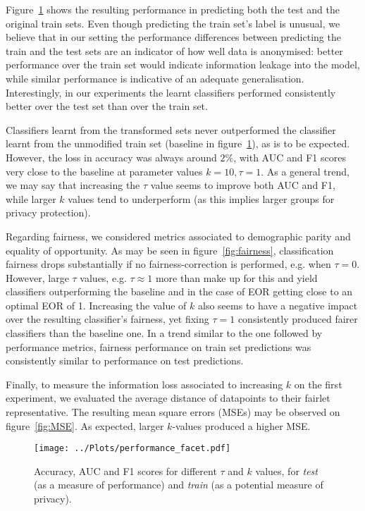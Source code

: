 \documentclass[runningheads]{llncs}
\begin{document}
Figure~\ref{fig:performance} shows the resulting performance in predicting both the test and the original train sets. Even though predicting the train set's label is unusual, we believe that in our setting the performance differences between predicting the train and the test sets are an indicator of how well data is anonymised: better performance over the train set would indicate information leakage into the model, while similar performance is indicative of an adequate generalisation. Interestingly, in our experiments the learnt classifiers performed consistently better over the test set than over the train set.

Classifiers learnt from the transformed sets never outperformed the classifier learnt from the unmodified train set (baseline in figure~\ref{fig:performance}), as is to be expected. However, the loss in accuracy was always around $2\%$, with AUC and F1 scores very close to the baseline at parameter values $k = 10, \tau = 1$. As a general trend, we may say that increasing the $\tau$ value seems to improve both AUC and F1, while larger $k$ values tend to underperform (as this implies larger groups for privacy protection).

Regarding fairness, we considered metrics associated to demographic parity and equality of opportunity. As may be seen in figure~\ref{fig:fairness}, classification fairness drops substantially if no fairness-correction is performed, e.g. when $\tau = 0$. However, large $\tau$ values, e.g. $\tau \approx 1$ more than make up for this and yield classifiers outperforming the baseline and in the case of EOR getting close to an optimal EOR of 1. Increasing the value of $k$ also seems to have a negative impact over the resulting classifier's fairness, yet fixing $\tau = 1$ consistently produced fairer classifiers than the baseline one. In a trend similar to the one followed by performance metrics, fairness performance on train set predictions was consistently similar to performance on test predictions.

Finally, to measure the information loss associated to increasing $k$ on the first experiment, we evaluated the average distance of datapoints to their fairlet representative. The resulting mean square errors (MSEs) may be observed on figure~\ref{fig:MSE}. As expected, larger $k$-values produced a higher MSE.

\begin{figure}[p]
  \centering
  \texttt{[image: ../Plots/performance\_facet.pdf]}
  \caption{Accuracy, AUC and F1 scores for different $\tau$ and $k$ values, for \emph{test} (as a measure of performance) and \emph{train} (as a potential measure of privacy).}
  \label{fig:performance}
\end{figure}
\end{document}
